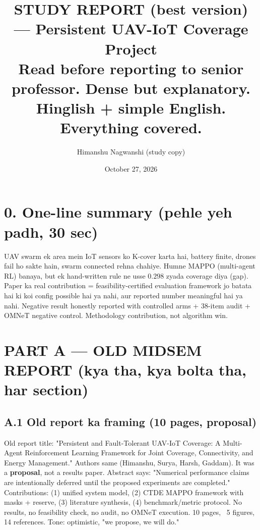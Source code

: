 \documentclass[10pt]{article}
\title{STUDY REPORT (best version) --- Persistent UAV-IoT Coverage Project\\
{\small Read before reporting to senior professor. Dense but explanatory. Hinglish + simple English. Everything covered.}}
\author{Himanshu Nagwanshi (study copy)}
\date{October 27, 2026}
\begin{document}
\maketitle

\section*{0. One-line summary (pehle yeh padh, 30 sec)}
UAV swarm ek area mein IoT sensors ko K-cover karta hai, battery finite, drones fail ho sakte hain, swarm connected rehna chahiye. Humne MAPPO (multi-agent RL) banaya, but ek hand-written rule ne usse $0.298$ zyada coverage diya (gap). Paper ka real contribution = feasibility-certified evaluation framework jo batata hai ki koi config possible hai ya nahi, aur reported number meaningful hai ya nahi. Negative result honestly reported with controlled arms + 38-item audit + OMNeT negative control. Methodology contribution, not algorithm win.

\section{PART A --- OLD MIDSEM REPORT (kya tha, kya bolta tha, har section)}

\subsection{A.1 Old report ka framing (10 pages, proposal)}
Old report title: "Persistent and Fault-Tolerant UAV-IoT Coverage: A Multi-Agent Reinforcement Learning Framework for Joint Coverage, Connectivity, and Energy Management." Authors same (Himanshu, Surya, Harsh, Gaddam). It was a \textbf{proposal}, not a results paper. Abstract says: "Numerical performance claims are intentionally deferred until the proposed experiments are completed." Contributions: (1) unified system model, (2) CTDE MAPPO framework with masks + reserve, (3) literature synthesis, (4) benchmark/metric protocol. No results, no feasibility check, no audit, no OMNeT execution. 10 pages, ~5 figures, 14 references. Tone: optimistic, "we propose, we will do."
\end{document}
